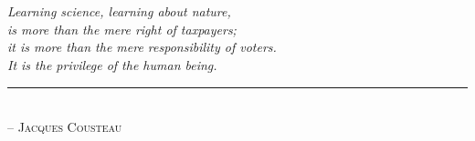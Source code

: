 \chapter*{~}


    
    



\begin{center}                      %
\vspace*{2.5in}                     %
\begin{onehalfspacing}
    \textit{
   Learning science, learning about nature, \\
   is more than the mere right of taxpayers; \\
   it is more than the mere responsibility of voters. \\
   It is the privilege of the human being.
    } \\
    
    \rule{1.5in}{0.5pt} \\          %
    
    \textsc{-- Jacques Cousteau}
\end{onehalfspacing}
\end{center}
